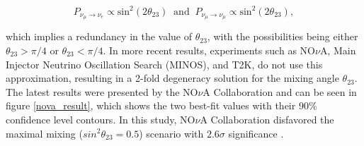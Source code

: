 \begin{equation}
	P_{\nu_\mu \rightarrow \nu_e} \propto \text{sin}^2(2\theta_{23}) \ \text{ and } \ P_{\nu_\mu \rightarrow \nu_\mu} \propto \text{sin}^2(2\theta_{23}),
	\nonumber
\end{equation}

which implies a redundancy in the value of $\theta_{23}$, with the possibilities being either $\theta_{23} > \pi/4$ or $\theta_{23} < \pi/4$. 
In more recent results, experiments such as NO$\nu$A, Main Injector Neutrino Oscillation Search (MINOS), and T2K, do not use this approximation, resulting in a 2-fold degeneracy solution for the mixing angle $\theta_{23}$. The latest results were presented by the NO$\nu$A Collaboration and can be seen in figure \ref{nova_result}, which shows the two best-fit values with their 90\% confidence level contours. In this study, NO$\nu$A Collaboration disfavored the maximal mixing ($sin^2 \theta_{23} = 0.5$) scenario with $2.6 \sigma$ significance \cite{NOVA}.


